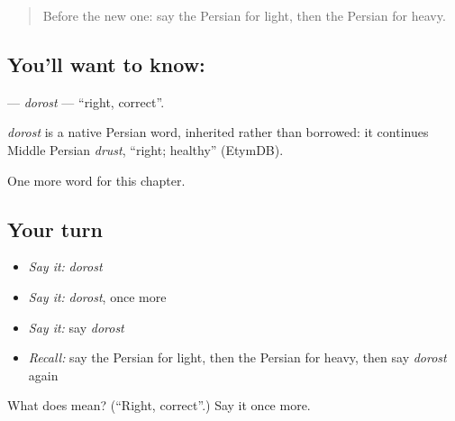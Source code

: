\label{lesson:FA-C62-dorost}



\begin{quote}
Before the new one: say the Persian for light, then the Persian for heavy.
\end{quote}

\subsection*{You'll want to know: }
\textbf{} — \emph{dorost} — \textquotedblleft{}right, correct\textquotedblright{}.

\begin{cousinweb}
\emph{dorost} is a native Persian word, inherited rather than borrowed: it continues Middle Persian \emph{drust}, \textquotedblleft{}right; healthy\textquotedblright{} (EtymDB).
\end{cousinweb}

\begin{grammarlens}[title={What you've built}]
One more word for this chapter.
\end{grammarlens}

\subsection*{Your turn}
\begin{itemize}
\raggedright
  \item \emph{Say it:} \emph{dorost}
  \item \emph{Say it:} \emph{dorost}, once more
  \item \emph{Say it:} say \emph{dorost}
  \item \emph{Recall:} say the Persian for light, then the Persian for heavy, then say \emph{dorost} again
\end{itemize}

\begin{tcolorbox}[breakable,colback=teal!4,colframe=teal!35!black,title={Before you move on}]
What does  mean? (\textquotedblleft{}Right, correct\textquotedblright{}.) Say it once more.
\end{tcolorbox}
